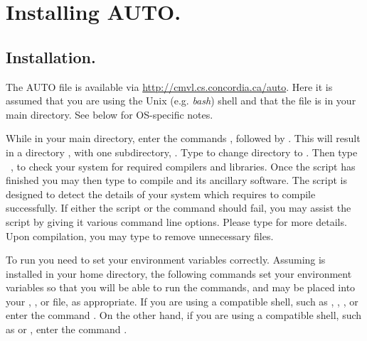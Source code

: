 \documentclass[12pt]{report}
\begin{document}
\chapter{Installing {\cal AUTO}.} \label{ch:Installing_AUTO}
\section{ Installation.} \label{sec:Installation}
The {\cal AUTO} file  is
available via \url{http://cmvl.cs.concordia.ca/auto}.
Here it is assumed that you are using the Unix (e.g. \emph{bash}) shell 
and that the file  is in your main
directory. See below for OS-specific notes.

While in your main directory, enter the commands
,
followed by .
This will result in a directory , 
with one subdirectory, . 
Type 
to change directory to .
Then type
~,
to check your system for required compilers and libraries.
Once the  script has finished you 
may then type  to compile \AUTO
and its ancillary software.
The  script is designed to detect the details
of your system which \AUTO requires to compile successfully.
If either the  script or the  command
should fail, you may assist the  script by giving
it various command line options.  Please type 
for more details.
Upon compilation, you may type 
to remove unnecessary files.

To run \AUTO you need to set your environment variables correctly.
Assuming \AUTO is installed in your home directory, the following
commands set your environment variables so that you will be able to
run the \AUTO commands, and may be placed into your ,
, or  file, as appropriate.  If you are
using a  compatible shell, such as ,
, , or  enter the command
.  On the
other hand, if you are using a  compatible shell, such
as  or , enter the command .
\end{document}

